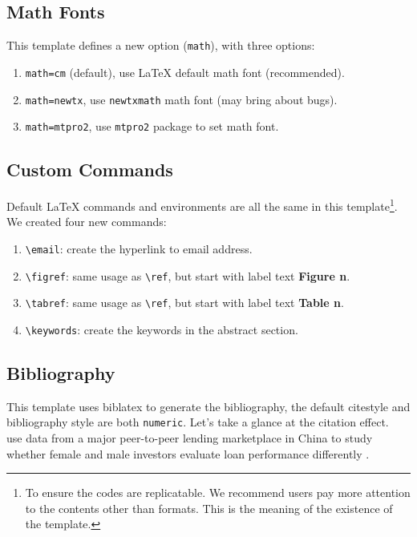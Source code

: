 \documentclass[lang=en,a4paper,bibend=bibtex]{elegantcs}
\begin{document}
\subsection{Math Fonts}

This template defines a new option (\lstinline{math}), with three options:

\begin{enumerate}
  \item \lstinline{math=cm} (default), use \LaTeX{} default math font (recommended).
  \item \lstinline{math=newtx}, use \lstinline{newtxmath} math font (may bring about bugs).
  \item \lstinline{math=mtpro2}, use \lstinline{mtpro2} package to set math font.
\end{enumerate}


\subsection{Custom Commands}
Default \LaTeX{} commands and environments are all the same in this template\footnote{To ensure the codes are replicatable. We recommend users pay more attention to the contents other than formats. This is the meaning of the existence of the template.}. We created four new commands:
\begin{enumerate}
  \item \lstinline{\email}: create the hyperlink to email address.
  \item \lstinline{\figref}: same usage as \lstinline{\ref}, but start with label text \textbf{Figure n}.
  \item \lstinline{\tabref}: same usage as \lstinline{\ref}, but start with label text \textbf{Table n}.
  \item \lstinline{\keywords}: create the keywords in the abstract section.
\end{enumerate}


\subsection{Bibliography}

This template uses biblatex to generate the bibliography, the default citestyle and bibliography style are both \lstinline{numeric}. Let's take a glance at the citation effect. ~\cite{en1} use data from a major peer-to-peer lending \cite{en3} marketplace in China to study whether female and male investors evaluate loan performance differently \parencite{en2}.
\end{document}
